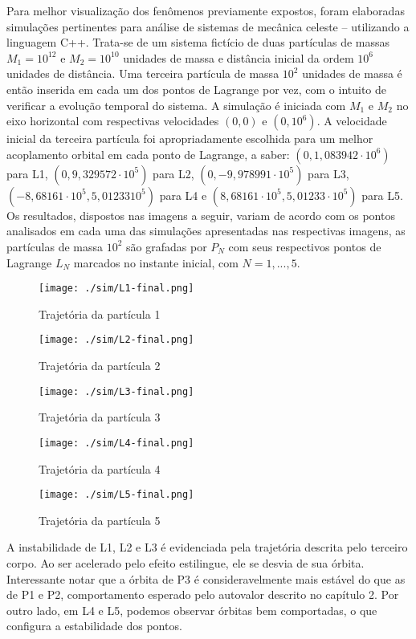    Para melhor visualização dos fenômenos previamente expostos, foram elaboradas simulações pertinentes para análise de sistemas de mecânica celeste \cite{sashalag, sashaeng} -- utilizando a linguagem C++. Trata-se de um sistema fictício de duas partículas de massas $M_1 = 10^{12}$ e $M_2 = 10^{10}$ unidades de massa e distância inicial da ordem $10^6$ unidades de distância. Uma terceira partícula de massa $10^2$ unidades de massa é então inserida em cada um dos pontos de Lagrange por vez, com o intuito de verificar a evolução temporal do sistema. A simulação é iniciada com $M_1$ e $M_2$ no eixo horizontal com respectivas velocidades $(0,0)$ e $(0, 10^6)$. A velocidade inicial da terceira partícula foi apropriadamente escolhida para um melhor acoplamento orbital em cada ponto de Lagrange, a saber: $(0,1,083942 \cdot 10^6)$ para L1, $(0,9,329572 \cdot 10^5)$ para L2, $(0,-9,978991 \cdot 10^5)$ para L3, $(-8,68161\cdot 10^5, 5,01233 10^5)$ para L4 e $(8,68161\cdot 10^5, 5,01233 \cdot 10^5)$ para L5. Os resultados, dispostos nas imagens a seguir, variam de acordo com os pontos analisados em cada uma das simulações apresentadas nas respectivas imagens, as partículas de massa $10^2$ são grafadas por $P_{N}$ com seus respectivos pontos de Lagrange $L_{N}$ marcados no instante inicial, com $N = 1,..., 5$. 
   
\begin{figure}[h]
\begin{minipage}{0.5\textwidth}
\centering
\texttt{[image: ./sim/L1-final.png]}
\caption{Trajetória da partícula 1}
\end{minipage}
\begin{minipage}{0.5\textwidth}
\centering
\texttt{[image: ./sim/L2-final.png]}
\caption{Trajetória da partícula 2}
\end{minipage}
\end{figure}

\begin{figure}[h]
\begin{minipage}{0.5\textwidth}
\centering
\texttt{[image: ./sim/L3-final.png]}
\caption{Trajetória da partícula 3}
\end{minipage}
\begin{minipage}{0.5\textwidth}
\centering
\texttt{[image: ./sim/L4-final.png]}
\caption{Trajetória da partícula 4}
\end{minipage}
\end{figure}

\begin{figure}[H]
\centering
\texttt{[image: ./sim/L5-final.png]}
\caption{Trajetória da partícula 5}
\end{figure}

   A instabilidade de L1, L2 e L3 é evidenciada pela trajetória descrita pelo terceiro corpo. Ao ser acelerado pelo efeito estilingue, ele se desvia de sua órbita. Interessante notar que a órbita de P3 é consideravelmente mais estável do que as de P1 e P2, comportamento esperado pelo autovalor descrito no capítulo 2. Por outro lado, em L4 e L5, podemos observar órbitas bem comportadas, o que configura a estabilidade dos pontos.
